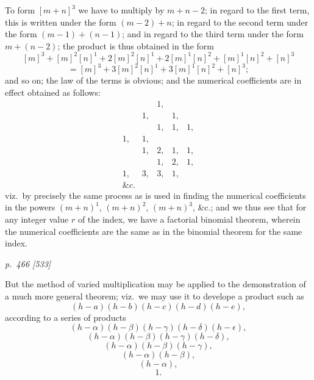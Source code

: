 \documentclass[11pt,a4paper]{article}
\theoremstyle{plain}
\theoremstyle{definition}
\begin{document}
To form $[m + n]^3$ we have to multiply by $m + n - 2$; in regard to the first term, this
is written under the form $(m - 2) + n$; in regard to the second term under the form
$(m - 1) + (n - 1)$; and in regard to the third term under the form $m + (n - 2)$; the
product is thus obtained in the form
\[
[m]^3+[m]^2[n]^1+2[m]^2[n]^1+2[m]^1[n]^2+[m]^1[n]^2+[n]^3
\]
\[
=[m]^3+3[m]^2[n]^1+3[m]^1[n]^2+[n]^3;
\]
and so on; the law of the terms is obvious; and the numerical coefficients are in
effect obtained as follows:
\[
\begin{array}{ccccc}
& & 1, & & \\
& 1, & & 1, & \\
& & 1, & 1, & 1, \\
1, & 1, & & & \\
& 1, & 2, & 1, & 1, \\
& & 1, & 2, & 1, \\
1, & 3, & 3, & 1, & \\
\&c.
\end{array}
\]
viz.\ by precisely the same process as is used in finding the numerical coefficients in
the powers $(m + n)^1$, $(m + n)^2$, $(m + n)^3$, \&c.; and we thus see that for any integer value
$r$ of the index, we have a factorial binomial theorem, wherein the numerical coefficients
are the same as in the binomial theorem for the same index.

\clearpage

\bigskip
\textit{p.~466 [533]}
\smallskip

But the method of varied multiplication may be applied to the demonstration of
a much more general theorem; viz.\ we may use it to develope a product such as
\[
(h-a)(h-b)(h-c)(h-d)(h-e),
\]
according to a series of products
\[
(h-\alpha)(h-\beta)(h-\gamma)(h-\delta)(h-\epsilon),
\]
\[
(h-\alpha)(h-\beta)(h-\gamma)(h-\delta),
\]
\[
(h-\alpha)(h-\beta)(h-\gamma),
\]
\[
(h-\alpha)(h-\beta),
\]
\[
(h-\alpha),
\]
\[
1.
\]
\end{document}
